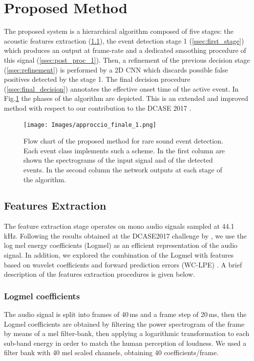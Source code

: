 \section{Proposed Method}
\label{sec:proposed-meth}
The proposed system is a hierarchical algorithm composed of five stages: the acoustic features extraction (\ref{ssec:feat}),  the event detection stage 1 (\ref{ssec:first_stage}) which produces an output at frame-rate and a dedicated smoothing procedure of this signal (\ref{ssec:post_proc_1}).
Then, a refinement of the previous decision stage (\ref{ssec:refinement}) is performed by a 2D CNN which discards possible false positives detected by the stage 1. The final decision procedure (\ref{ssec:final_decision}) annotates the effective onset time of the active event. In Fig.\ref{fig:flow-chart} the phases of the algorithm are depicted. This is an extended and improved method with respect to our contribution to the DCASE 2017 \cite{vesperinihierarchic}.

\begin{figure}[t]
	\centering
	\vspace{0.2cm}\texttt{[image: Images/approccio\_finale\_1.png]}
	\caption{Flow chart of the proposed method for rare sound event detection. Each event class implements such a scheme. In the first column are shown the spectrograms of the input signal and of the detected events. In the second column the network outputs at each stage of the algorithm.}
	\label{fig:flow-chart}
\end{figure}

\subsection{Features Extraction}
\label{ssec:feat}
The feature extraction stage operates on mono audio signals sampled at 44.1 kHz. 
Following the results obtained at the DCASE2017 challenge by \cite{cakirconvolutional}, we use the log mel energy coefficients (Logmel) as an efficient representation of the audio signal. In addition, we explored the combination of the Logmel with features based on wavelet coefficients and forward prediction errors (WC-LPE) \cite{marchi2014multi}. A brief description of the features extraction procedures is given below.
\subsubsection{Logmel coefficients}
The audio signal is split into frames of 40\,ms and a frame step of 20\,ms, then the Logmel coefficients are obtained by filtering the power spectrogram of the frame by means of a mel filter-bank, then applying a logarithmic  transformation to each sub-band energy in order to match the human perception of loudness. We used a filter bank with 40 mel scaled channels, obtaining 40 coefficients/frame. 

